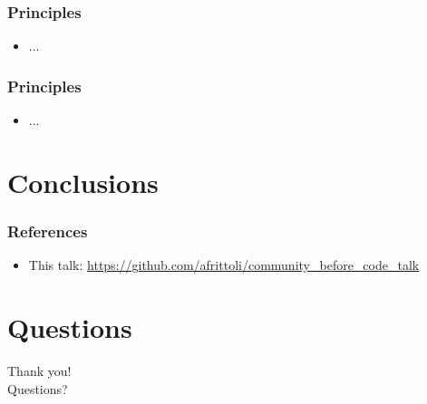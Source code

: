 \documentclass[aspectratio=169,11pt,hyperref={colorlinks=true}]{beamer}
\begin{document}
\begin{frame}
  \frametitle{Principles}
    \begin{itemize}
        \item{...}
    \end{itemize}
\end{frame}

\begin{frame}
  \frametitle{Principles}
    \begin{itemize}
        \item{...}
    \end{itemize}
\end{frame}

\section{Conclusions}

\begin{frame}
  \frametitle{References}
  \begin{itemize}
      \item{This talk: \href{https://github.com/afrittoli/community\_before\_code\_talk}{https://github.com/afrittoli/community\_before\_code\_talk}}
  \end{itemize}
\end{frame}

\section{Questions}
\begin{frame}[c]
    \begin{center}
        \Huge Thank you!\\Questions?
    \end{center}
\end{frame}
\end{document}
